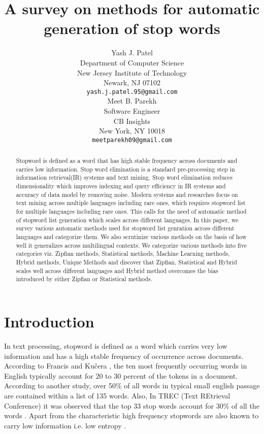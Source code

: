 \documentclass{article}
\title{A survey on methods for automatic generation of stop words}
\author{
  Yash J. Patel \\
  Department of Computer Science\\
  New Jersey Institute of Technology\\
  Newark, NJ 07102 \\
  \texttt{yash.j.patel.95@gmail.com} \\
   \And
  Meet B. Parekh \\
  Software Engineer\\
  CB Insights\\
  New York, NY 10018 \\
  \texttt{meetparekh09@gmail.com} \\
}
\begin{document}
\maketitle

\begin{abstract}
Stopword is defined as a word that has high stable frequency across documents and carries low information. Stop word elimination is a standard pre-processing step in information retrieval(IR) systems and text mining. Stop word elimination reduces dimensionality which improves indexing and query efficiency in IR systems and accuracy of data model by removing noise. Modern systems and researches focus on text mining across multiple languages including rare ones, which requires stopword list for multiple languages including rare ones. This calls for the need of automatic method of stopword list generation which scales across different languages. In this paper, we survey various automatic methods used for stopword list genration across different languages and categorize them. We also scrutinize various methods on the basis of how well it generalizes across multilingual contexts. We categorize various methods into five categories viz. Zipfian methods, Statistical methods, Machine Learning methods, Hybrid methods, Unique Methods and discover that Zipfian, Statistical  and Hybrid  scales well across different languages and Hybrid method overcomes the bias introduced by either Zipfian or Statistical methods.
\end{abstract}




\section{Introduction}
In text processing, stopword is defined as a word which carries very low information and has a high stable frequency \cite{cite1} of occurrence across documents. According to Francis and Kučera \cite{cite2}, the ten most frequently occurring words in English typically account for 20 to 30 percent of the tokens in a document. According to another study, over 50\% of all words in typical small english passage are contained within a list of 135 words\cite{cite3}. Also, In TREC (Text REtrieval Conference) it was observed that the top 33 stop words account for 30\% of all the words \cite{cite4}. Apart from the characteristic high frequency stopwords are also known to carry low information i.e. low entropy \cite{cite5}.
\end{document}
